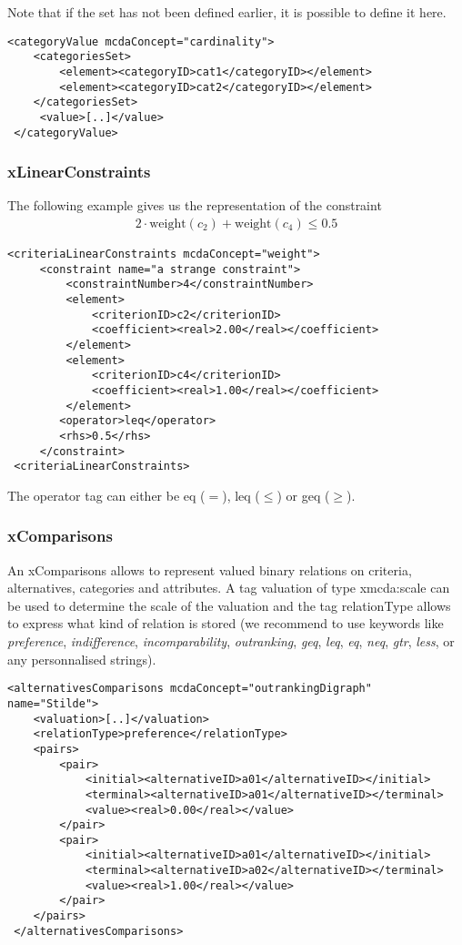 \documentclass[a4paper,oneside,10 pt]{article}
\newcommand{\code}{\asciifamily}
\begin{document}
Note that if the set has not been defined earlier, it is possible to define it here. 
{\code
\begin{lstlisting}[style=prototype]
 <categoryValue mcdaConcept="cardinality">
	<categoriesSet>
		<element><categoryID>cat1</categoryID></element>
		<element><categoryID>cat2</categoryID></element>
	</categoriesSet>
	 <value>[..]</value>
 </categoryValue>
\end{lstlisting}
}

\subsubsection{{\code x}LinearConstraints}

The following example gives us the representation of the constraint
\begin{eqnarray*}
	2\cdot \mbox{weight}(c_{2})+\mbox{weight}(c_{4}) \leq 0.5
\end{eqnarray*}
{\code
\begin{lstlisting}[style=prototype]
 <criteriaLinearConstraints mcdaConcept="weight">
	 <constraint name="a strange constraint">
		 <constraintNumber>4</constraintNumber>
		 <element>
			 <criterionID>c2</criterionID>
			 <coefficient><real>2.00</real></coefficient>
		 </element>
		 <element>
			 <criterionID>c4</criterionID>
			 <coefficient><real>1.00</real></coefficient>
		 </element>
		<operator>leq</operator>
		<rhs>0.5</rhs>
	 </constraint>
 <criteriaLinearConstraints>
\end{lstlisting}
}

The {\code operator} tag can either be {\code eq} ($=$), {\code leq} ($\leq$) or {\code geq} ($\geq$). 

\subsubsection{{\code x}Comparisons}

An {\code x}Comparisons allows to represent valued binary relations on criteria, alternatives, categories and attributes. A tag {\code valuation} of type {\code xmcda:scale} can be used to determine the scale of the valuation and the tag {\code relationType} allows to express what kind of relation is stored (we recommend to use keywords like \textit{preference}, \textit{indifference}, \textit{incomparability}, \textit{outranking}, \textit{geq}, \textit{leq}, \textit{eq}, \textit{neq}, \textit{gtr}, \textit{less}, or any personnalised strings). 

{\code
\begin{lstlisting}[style=prototype]
 <alternativesComparisons mcdaConcept="outrankingDigraph" name="Stilde">
	<valuation>[..]</valuation>
	<relationType>preference</relationType>
 	<pairs>
		<pair>
			<initial><alternativeID>a01</alternativeID></initial>
			<terminal><alternativeID>a01</alternativeID></terminal>
			<value><real>0.00</real></value>
		</pair>
		<pair>
			<initial><alternativeID>a01</alternativeID></initial>
			<terminal><alternativeID>a02</alternativeID></terminal>
			<value><real>1.00</real></value>
		</pair>
 	</pairs>
 </alternativesComparisons>
\end{lstlisting}
}
\end{document}

